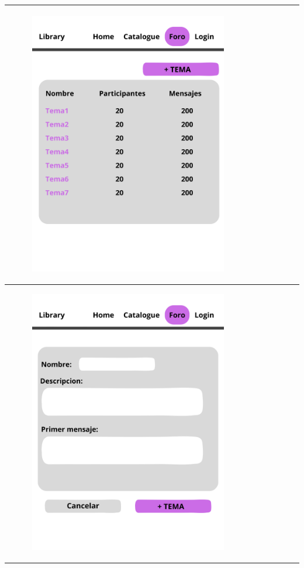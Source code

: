\documentclass{report}
\begin{document}
\begin{center}
\begin{longtable}{|p{\linewidth}|}
                    \hline
                    \begin{figure}[H]
                        \centering
                        \includegraphics[width=0.8\textwidth]{./img/grafico/Foro2.png}
                    \end{figure}\\
                    \hline
                    \begin{figure}[H]
                        \centering
                        \includegraphics[width=0.8\textwidth]{./img/grafico/Foro3.png}

\end{figure}
\end{longtable}
\end{center}
\end{document}
